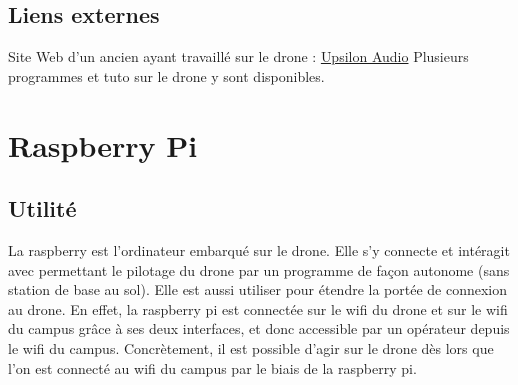 \documentclass[letterpaper,10pt,french]{sphinxmanual}
\begin{document}
\section{Liens externes}
\label{ardrone:liens-externes}
Site Web d'un ancien ayant travaillé sur le drone : \href{http://www.upsilonaudio.com/category/drones/}{Upsilon Audio}
Plusieurs programmes et tuto sur le drone y sont disponibles.


\chapter{Raspberry Pi}
\label{raspberrypi:raspberry-pi}\label{raspberrypi::doc}

\section{Utilité}
\label{raspberrypi:utilite}
La raspberry est l'ordinateur embarqué sur le drone. Elle s'y connecte et intéragit avec permettant le pilotage du
drone par un programme de façon autonome (sans station de base au sol). Elle est aussi utiliser pour étendre la portée
de connexion au drone. En effet, la raspberry pi est connectée sur le wifi du drone et sur le wifi du campus grâce à
ses deux interfaces, et donc accessible par un opérateur depuis le wifi du campus. Concrètement, il est possible d'agir
sur le drone dès lors que l'on est connecté au wifi du campus par le biais de la raspberry pi.
\end{document}
